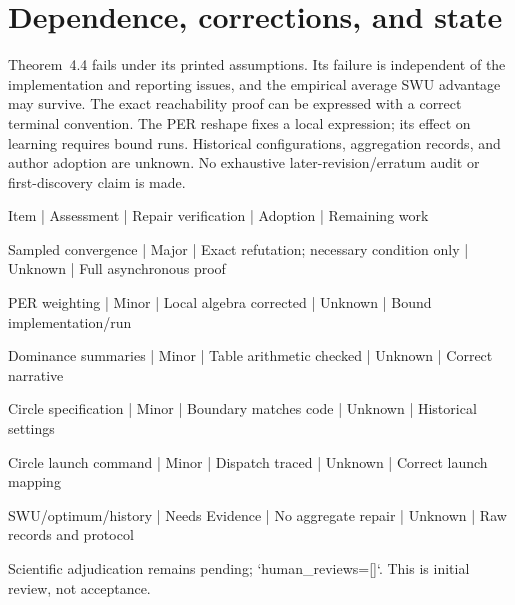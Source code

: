 \documentclass[10pt]{article}
\begin{document}
\section*{Dependence, corrections, and state}
Theorem 4.4 fails under its printed assumptions. Its failure is independent of the implementation and reporting issues, and the empirical average SWU advantage may survive. The exact reachability proof can be expressed with a correct terminal convention. The PER reshape fixes a local expression; its effect on learning requires bound runs. Historical configurations, aggregation records, and author adoption are unknown. No exhaustive later-revision/erratum audit or first-discovery claim is made.\par
Item | Assessment | Repair verification | Adoption | Remaining work\par
Sampled convergence | Major | Exact refutation; necessary condition only | Unknown | Full asynchronous proof\par
PER weighting | Minor | Local algebra corrected | Unknown | Bound implementation/run\par
Dominance summaries | Minor | Table arithmetic checked | Unknown | Correct narrative\par
Circle specification | Minor | Boundary matches code | Unknown | Historical settings\par
Circle launch command | Minor | Dispatch traced | Unknown | Correct launch mapping\par
SWU/optimum/history | Needs Evidence | No aggregate repair | Unknown | Raw records and protocol\par
Scientific adjudication remains pending; `human\_reviews=[]`. This is initial review, not acceptance.\par
\end{document}
